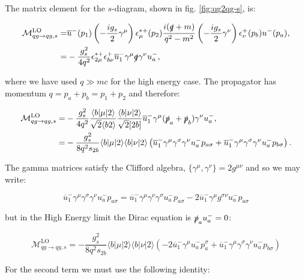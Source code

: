 			The matrix element for the $s$-diagram, shown in fig. \eqref{fig:qg2qg-s}, is:

			\begin{align}
				\mathcal{M}_{qg\rightarrow qg, s}^{\text{LO}}=&\overline{u}^-(p_1)\left(-\frac{ig_s}{2}\gamma^\mu\right)\epsilon_\mu^{*+}(p_2)
					\frac{i(\slashed q+m)}{q^2-m^2}\left(-\frac{ig_s}{2}\gamma^\nu\right)\epsilon^+_\nu(p_b)u^-(p_a), \\
				=&-\frac{g^2_s}{4q^2}\epsilon^{*+}_{2\mu}\epsilon^+_{b\nu}\overline{u}^-_1\gamma^\mu\slashed q\gamma^\nu u^-_a,
			\end{align}

			where we have used $q\gg mc$ for the high energy case.  The propagator has momentum $q=p_a+p_b=p_1+p_2$ and therefore:

			\begin{align}
				\mathcal{M}_{qg\rightarrow qg, s}^{\text{LO}}=&-\frac{g^2_s}{4q^2}\frac{\langle{b}|\mu|2\rangle}{\sqrt{2}\langle{b2\rangle}}
				\frac{\langle{b}|\nu|2\rangle}{\sqrt{2}[2b]}\overline{u}^-_1\gamma^\mu(\slashed{p}_a+\slashed{p}_b)\gamma^\nu u^-_a,\\
				=&-\frac{g^2_s}{8q^2s_{2b}}\langle{b}|\mu|2\rangle\langle{b}|\nu|2\rangle
				\left(\overline{u}^-_1\gamma^\mu\gamma^\sigma\gamma^\nu u^-_ap_{a\sigma}+
				\overline{u}^-_1\gamma^\mu\gamma^\sigma\gamma^\nu u^-_ap_{b\sigma}\right).
			\end{align}

			The gamma matrices satisfy the Clifford algebra, $\{\gamma^\mu, \gamma^\nu\}=2g^{\mu\nu}$ and so we may write:

			\begin{equation}
				\overline{u}^-_1\gamma^\mu\gamma^\sigma\gamma^\nu u^-_ap_{a\sigma}=
				\overline{u}^-_1\gamma^\mu\gamma^\nu\gamma^\sigma u^-_ap_{a\sigma} -
				2\overline{u}^-_1\gamma^\mu g^{\sigma\nu}u^-_ap_{a\sigma}
			\end{equation}

			but in the High Energy limit the Dirac equation is $\slashed{p}_au^-_a=0$:

			\begin{equation}
				\mathcal{M}_{qg\rightarrow qg, s}^{\text{LO}}=-\frac{g^2_s}{8q^2s_{2b}}\langle{b}|\mu|2\rangle\langle{b}|\nu|2\rangle
				\left(-2\overline{u}^-_1\gamma^\mu u^-_ap_{a}^\sigma+\overline{u}^-_1\gamma^\mu\gamma^\sigma\gamma^\nu u^-_ap_{b\sigma}\right)
			\end{equation}

			For the second term we must use the following identity:

